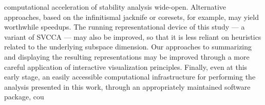 computational acceleration of stability analysis wide-open. Alternative
approaches, based on the infinitismal jacknife or coresets, for example, may
yield worthwhile speedups. The running representational device of this study — a
variant of SVCCA — may also be improved, so that it is less reliant on
heuristics related to the underlying subspace dimension. Our approaches to
summarizing and displaying the resulting representations may be improved through
a more careful application of interactive visualization principles. Finally,
even at this early stage, an easily accessible computational infrastructure for
performing the analysis presented in this work, through an appropriately
maintained software package, cou
